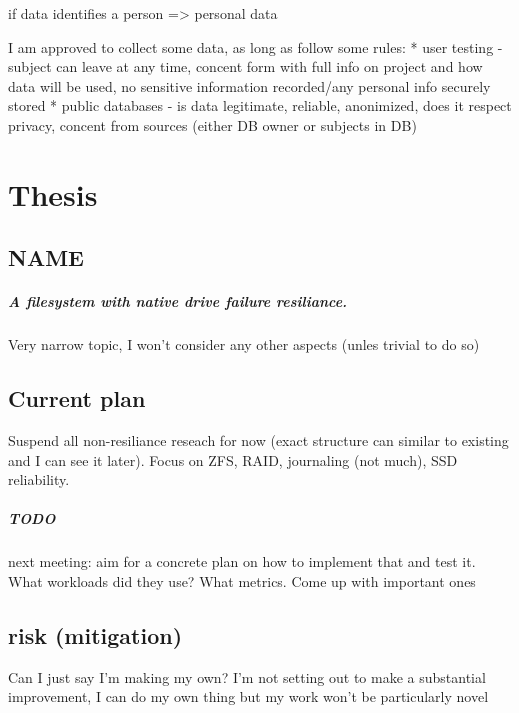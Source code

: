 \documentclass[a4paper]{report}
\begin{document}
          if data identifies a person => personal data

          I am approved to collect some data, as long as follow some rules:
          * user testing - subject can leave at any time, concent form with full
            info on project and how data will be used, no sensitive information
            recorded/any personal info securely stored
          * public databases - is data legitimate, reliable, anonimized, does
            it respect privacy, concent from sources (either DB owner or subjects
            in DB)


\chapter{Thesis}
    \section{NAME}
        \paragraph{A filesystem with native drive failure resiliance.}
        Very narrow topic, I won't consider any other aspects (unles trivial to
        do so)

    \section{Current plan}
        Suspend all non-resiliance reseach for now (exact structure can similar
        to existing and I can see it later). Focus on ZFS, RAID, journaling
        (not much), SSD reliability.


        \paragraph{TODO} next meeting: aim for a concrete plan on how to implement that and
        test it. What workloads did they use? What metrics. Come up with important ones


    \section{risk (mitigation)}
        Can I just say I'm making my own? I'm not setting out to make a
        substantial improvement, I can do my own thing but my work won't be
        particularly novel
\end{document}
